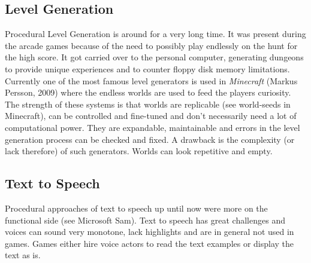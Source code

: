 \documentclass[10pt,a4paper]{article}
\begin{document}
\subsection{Level Generation}
Procedural Level Generation is around for a very long time. It was present during the arcade games because of the need to possibly play endlessly on the hunt for the high score. It got carried over to the personal computer, generating dungeons to provide unique experiences\cite{VanderLinden2014} and to counter floppy disk memory limitations. Currently one of the most famous level generators is used in \textit{Minecraft} (Markus Persson, 2009) where the endless worlds are used to feed the players curiosity. The strength of these systems is that worlds are replicable (see world-seeds in Minecraft), can be controlled and fine-tuned and don't necessarily need a lot of computational power. They are expandable, maintainable and errors in the level generation process can be checked and fixed. A drawback is the complexity (or lack therefore) of such generators. Worlds can look repetitive and empty.

\subsection{Text to Speech}
Procedural approaches of text to speech up until now were more on the functional side (see Microsoft Sam). Text to speech has great challenges and voices can sound very monotone, lack highlights and are in general not used in games. Games either hire voice actors to read the text examples or display the text as is.
\end{document}
